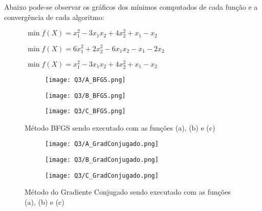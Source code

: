 \documentclass[fleqn, 11pt]{article}
\renewcommand{\min}{\expandafter\,\operatorname*{min}}
\begin{document}
Abaixo pode-se observar os gráficos dos mínimos computados de cada função e a convergência de cada algoritmo: 

\begin{figure}[H]
  \caption{$\min f(X) = x_1^2 - 3 x_1 x_2 + 4 x_2^2 + x_1 - x_2$}
\end{figure}


\begin{figure}[H]
  \caption{$\min f(X) = 6 x_1^2 + 2 x_2^2 - 6 x_1 x_2 - x_1 - 2 x_2$}
\end{figure}


\begin{figure}[H]
  \caption{$\min f(X) = x_1^2 - 3 x_1 x_2 + 4 x_2^2 + x_1 - x_2$}
\end{figure}


\begin{figure}[H]
\centering
\begin{subfigure}{.5\textwidth}
  \centering
  \texttt{[image: Q3/A\_BFGS.png]}
\end{subfigure}%
\begin{subfigure}{.5\textwidth}
  \centering
  \texttt{[image: Q3/B\_BFGS.png]}
\end{subfigure}
\begin{subfigure}{.5\textwidth}
  \centering
  \texttt{[image: Q3/C\_BFGS.png]}
\end{subfigure}
\caption{Método BFGS sendo executado com as funções (a), (b) e (c)}
\end{figure}

\begin{figure}[H]
\centering
\begin{subfigure}{.5\textwidth}
  \centering
  \texttt{[image: Q3/A\_GradConjugado.png]}
\end{subfigure}%
\begin{subfigure}{.5\textwidth}
  \centering
  \texttt{[image: Q3/B\_GradConjugado.png]}
\end{subfigure}
\begin{subfigure}{.5\textwidth}
  \centering
  \texttt{[image: Q3/C\_GradConjugado.png]}
\end{subfigure}
\caption{Método do Gradiente Conjugado sendo executado com as funções (a), (b) e (c)}
\end{figure}
\end{document}

